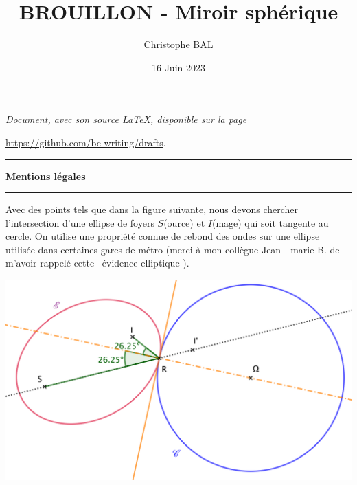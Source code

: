 \documentclass[12pt]{amsart}
\begin{document}
\title{BROUILLON - Miroir sphérique}
\author{Christophe BAL}
\date{16 Juin 2023}

\maketitle

\begin{center}
	\itshape
	Document, avec son source \LaTeX, disponible sur la page

	\url{https://github.com/bc-writing/drafts}.
\end{center}


\bigskip


\begin{center}
	\hrule\vspace{.3em}
	{
		\fontsize{1.35em}{1em}\selectfont
		\textbf{Mentions \og légales \fg}
	}

	\vspace{0.45em}
	\doclicenseThis
	\hrule
\end{center}


\bigskip




Avec des points tels que dans la figure suivante, nous devons chercher l'intersection d'une ellipse de foyers $S$(ource) et $I$(mage) qui soit tangente au cercle. On utilise une propriété connue de rebond des ondes sur une ellipse utilisée dans certaines gares de métro (merci à mon collègue Jean - marie B. de m'avoir rappelé cette \og\ évidence elliptique \fg ).

\begin{center}
	\includegraphics[scale=1.25]{ellipse.png}
\end{center}
\end{document}
